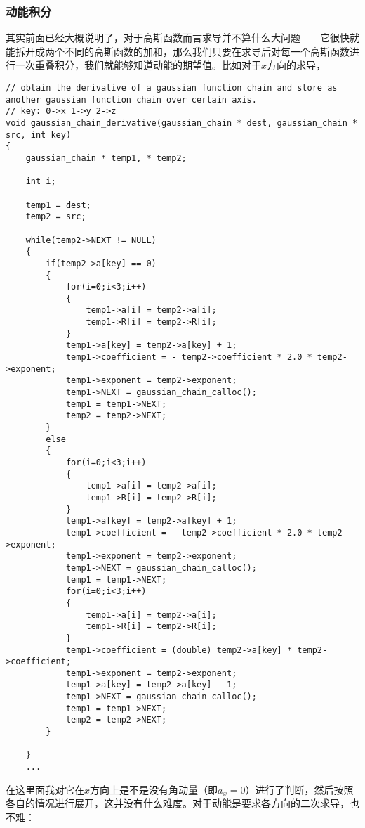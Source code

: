 \documentclass[12pt,a4paper,openany,twoside]{article}
\numberwithin{equation}{section}
\begin{document}
                \subsubsection{动能积分}
                其实前面已经大概说明了，对于高斯函数而言求导并不算什么大问题——它很快就能拆开成两个不同的高斯函数的加和，那么我们只要在求导后对每一个高斯函数进行一次重叠积分，我们就能够知道动能的期望值。比如对于$x$方向的求导，
                \begin{lstlisting}
// obtain the derivative of a gaussian function chain and store as another gaussian function chain over certain axis.
// key: 0->x 1->y 2->z
void gaussian_chain_derivative(gaussian_chain * dest, gaussian_chain * src, int key)
{
    gaussian_chain * temp1, * temp2;

    int i;

    temp1 = dest;
    temp2 = src;

    while(temp2->NEXT != NULL)
    {
        if(temp2->a[key] == 0)
        {
            for(i=0;i<3;i++)
            {
                temp1->a[i] = temp2->a[i];
                temp1->R[i] = temp2->R[i];
            }
            temp1->a[key] = temp2->a[key] + 1;
            temp1->coefficient = - temp2->coefficient * 2.0 * temp2->exponent;
            temp1->exponent = temp2->exponent;
            temp1->NEXT = gaussian_chain_calloc();
            temp1 = temp1->NEXT;
            temp2 = temp2->NEXT;
        }
        else
        {
            for(i=0;i<3;i++)
            {
                temp1->a[i] = temp2->a[i];
                temp1->R[i] = temp2->R[i];
            }
            temp1->a[key] = temp2->a[key] + 1;
            temp1->coefficient = - temp2->coefficient * 2.0 * temp2->exponent;
            temp1->exponent = temp2->exponent;
            temp1->NEXT = gaussian_chain_calloc();
            temp1 = temp1->NEXT;
            for(i=0;i<3;i++)
            {
                temp1->a[i] = temp2->a[i];
                temp1->R[i] = temp2->R[i];
            }
            temp1->coefficient = (double) temp2->a[key] * temp2->coefficient;
            temp1->exponent = temp2->exponent;
            temp1->a[key] = temp2->a[key] - 1;
            temp1->NEXT = gaussian_chain_calloc();
            temp1 = temp1->NEXT;
            temp2 = temp2->NEXT;
        }

    }
    ...
                \end{lstlisting}
                在这里面我对它在$x$方向上是不是没有角动量（即$a_x = 0$）进行了判断，然后按照各自的情况进行展开，这并没有什么难度。对于动能是要求各方向的二次求导，也不难：
\end{document}
